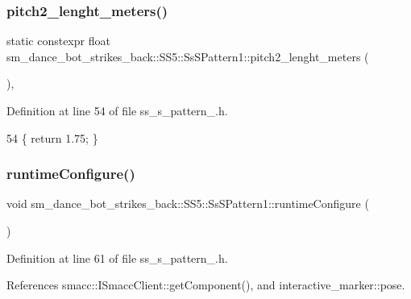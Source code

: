 \subsubsection{\texorpdfstring{pitch2\+\_\+lenght\+\_\+meters()}{pitch2\_lenght\_meters()}}
{\footnotesize\ttfamily static constexpr float sm\+\_\+dance\+\_\+bot\+\_\+strikes\+\_\+back\+::\+S\+S5\+::\+Ss\+S\+Pattern1\+::pitch2\+\_\+lenght\+\_\+meters (\begin{DoxyParamCaption}{ }\end{DoxyParamCaption})\hspace{0.3cm}{\ttfamily [inline]}, {\ttfamily [static]}}



Definition at line 54 of file ss\+\_\+s\+\_\+pattern\+\_.\+h.


\begin{DoxyCode}
54 \{ \textcolor{keywordflow}{return} 1.75; \}
\end{DoxyCode}
\mbox{\label{structsm__dance__bot__strikes__back_1_1SS5_1_1SsSPattern1_afe83fea063a0ffdab1e06a5ef5a518e1}} 
\subsubsection{\texorpdfstring{runtime\+Configure()}{runtimeConfigure()}}
{\footnotesize\ttfamily void sm\+\_\+dance\+\_\+bot\+\_\+strikes\+\_\+back\+::\+S\+S5\+::\+Ss\+S\+Pattern1\+::runtime\+Configure (\begin{DoxyParamCaption}{ }\end{DoxyParamCaption})\hspace{0.3cm}{\ttfamily [inline]}}



Definition at line 61 of file ss\+\_\+s\+\_\+pattern\+\_.\+h.



References smacc\+::\+I\+Smacc\+Client\+::get\+Component(), and interactive\+\_\+marker\+::pose.


